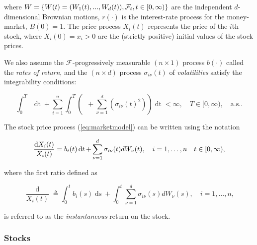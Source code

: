 \documentclass[british]{amsart} \usepackage{lmodern}
\numberwithin{equation}{section} \numberwithin{figure}{section}
\theoremstyle{plain} \newtheorem{thm}{\protect\theoremname}[section]
\theoremstyle{definition} \newtheorem{defn}[thm]{\protect\definitionname}
\theoremstyle{plain} \newtheorem{assumption}[thm]{\protect\assumptionname}
\theoremstyle{plain} \newtheorem{lem}[thm]{\protect\lemmaname}
\theoremstyle{plain} \newtheorem{prop}[thm]{\protect\propositionname}
\theoremstyle{remark} \newtheorem{rem}[thm]{\protect\remarkname}
\theoremstyle{plain} \newtheorem{cor}[thm]{\protect\corollaryname}
\renewcommand{\d}[1]{\mathop{\mathrm{d}{#1}}}
\newcommand{\filtration}[1]{\mathcal{F}_{#1}}
\newcommand{\defeq}{\mathop{\triangleq}} \newcommand{\almostsurely}{\text{a.s.}}
\newcommand{\abs}[1]{\mathop{|{#1}|}} \newcommand{\market}{\mathcal{M}}
\newcommand{\rangei}{i=1,\dots,n} \newcommand{\measure}{\mathbb{P}}
\begin{document}
where $W = \left\{ W(t)=(W_{1}(t),...,W_{d}(t)),\filtration{t},\ranget \right\}$
are the independent $d$-dimensional Brownian motions, $r(\cdot)$ is the
interest-rate process for the money-market, $B(0)=1$. The price process
$X_{i}(t)$ represents the price of the $i$th stock, where $X_{i}(0) = x_{i} > 0$
are the (strictly positive) initial values of the stock prices.

We also assume the $\filtration{}$-progressively measurable $(n \times 1)$
process $b(\cdot)$ called the \textit{rates of return}, and the $(n \times d)$
process $\sigma_{i\nu}(t)$ of \textit{volatilities} satisfy the integrability
conditions: 

\begin{equation*}
  \int_{0}^{T} 
  \abs{r(t)} 
  \d{t} +
  \sum_{i=1}^{n} \int_{0}^{T} 
    \left( 
        \abs{b_{i}(t)} +
        \sum_{\nu=1}^{d} ( \sigma_{i\nu}(t)^2  ) 
        \right) \d{t} < \infty,
  \quad T \in [0, \infty),
  \quad \almostsurely.
  \end{equation*}


The stock price process (\ref{eq:marketmodel}) can be written using the notation 

\begin{equation}
  \label{eq:stockpriceprocessdiff}
    \frac{\d{X_{i}(t)}}{X_{i}(t)} = b_{i}(t)\d{t} + \sum_{\nu=1}^{d} \sigma_{i\nu}(t) dW_{\nu}(t),
  \quad \rangei
  \quad \ranget,
\end{equation}

where the first ratio defined as

\begin{equation*}
  \frac{\d{X_{i}(t)}}{X_{i}(t)} \defeq 
  \int_{0}^{t} b_{i}(s)\d{s} + 
  \int_{0}^{t} \sum_{\nu=1}^{d} \sigma_{i\nu}(s) dW_{\nu}(s),
  \quad \rangei,
\end{equation*}

is referred to as the \textit{instantaneous} return on the stock.


\subsubsection{Stocks}
\end{document}
